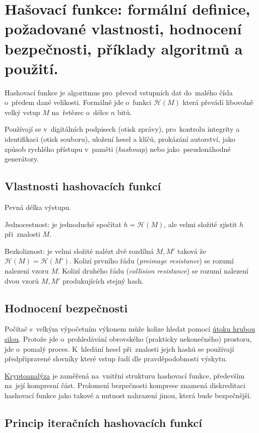 \clearpage
\section{Hašovací funkce: formální definice, požadované vlastnosti, hodnocení bezpečnosti, příklady algoritmů a použití.}

Hashovací funkce je algoritmus pro~převod vstupních dat do~malého čísla o~předem dané velikosti.
Formálně jde o~funkci $\mathcal{H}(M)$ která převádí libovolně velký vstup $M$ na~řetězec o~délce $n$ bitů.

Používají se v~digitálních podpisech (otisk zprávy), pro~kontrolu integrity a identifikaci (otisk souboru), uložení hesel a klíčů, prokázání autorství, jako způsob rychlého přístupu v~paměti (\emph{hashmap}) nebo jako~pseudonáhodné generátory.


\subsection{Vlastnosti hashovacích funkcí}

Pevná délka výstupu.

Jednocestnost: je jednoduché spočítat $h = \mathcal{H}(M)$, ale velmi složité zjistit $h$ při~znalosti $M$.

Bezkoliznost: je velmi složité nalézt dvě rozdílná $M, M'$ taková že $\mathcal{H}(M) = \mathcal{H}(M')$.
Kolizí prvního řádu (\emph{preimage resistance}) se rozumí nalezení vzoru $M$.
Kolizí druhého řádu (\emph{collision resistance}) se rozumí nalezení dvou vzorů $M, M'$ produkujících stejný hash.


\subsection{Hodnocení bezpečnosti}

Počítač s~velkým výpočetním výkonem může kolize hledat pomocí \uline{útoku hrubou silou}.
Protože jde o~prohledávání obrovského (prakticky nekonečného) prostoru, jde o~pomalý proces.
K~hledání hesel při~znalosti jejch hashů se používají předpřipravené slovníky které vstup řadí dle pravděpodobnosti výskytu.

\uline{Kryptoanalýza} je zaměřená na~vnitřní strukturu hashovací funkce, především na~její kompresní část.
Prolomení bezpečnosti komprese znamená diskreditaci hashovací funkce jako takové a nutnost nahrazení jinou, která bude bezpečnější.


\subsection{Princip iteračních hashovacích funkcí}

